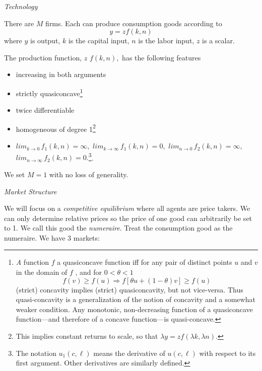 \documentclass{sebase}
\begin{document}
\textit{Technology}

There are $M$ firms. Each can produce consumption goods according to 
\begin{equation*}
y=zf(k,n)
\end{equation*}%
where $y$ is output, $k$ is the capital input, $n$ is the labor input, $z$
is a scalar.

\pagebreak

The production function, $z$ $f(k,n),$ has the following features

\begin{itemize}
\item increasing in both arguments

\item strictly quasiconcave\footnote{\textit{A} function $f$ a quasiconcave
function iff for any pair of distinct points $u$ and $v$ in the domain of $f$%
, and for $0<\theta <1$%
\begin{equation*}
f\left( v\right) \geq f\left( u\right) \Rightarrow f\left[ \theta u+\left(
1-\theta \right) v\right] \geq f\left( u\right)
\end{equation*}%
(strict) concavity implies (strict) quasiconcavity, but not vice-versa. Thus
quasi-concavity is a generalization of the notion of concavity and a
somewhat weaker condition. Any monotonic, non-decreasing function of a
quasiconcave function---and therefore of a concave function---is
quasi-concave.}

\item twice differentiable

\item homogeneous of degree 1\footnote{%
This implies constant returns to scale, so that $\lambda y=zf(\lambda
k,\lambda n).$}

\item $lim_{k\rightarrow 0}\,f_{1}(k,n)=\infty ,$ $lim_{k\rightarrow \infty
}\,f_{1}(k,n)=0,$ $lim_{n\rightarrow 0}\,f_{2}(k,n)=\infty ,$ $%
lim_{n\rightarrow \infty }\,f_{2}(k,n)=0.$\footnote{%
The notation $u_{1}(c,\ell )$ means the derivative of $u(c,\ell )$ with
respect to its first argument. Other derivatives are similarly defined.}.
\end{itemize}

We set $M=1$ with no loss of generality.

\pagebreak

\textit{Market Structure}

We will focus on a \textit{competitive equilibrium} where all agents are
price takers. We can only determine relative prices so the price of one good
can arbitrarily be set to 1. We call this good the \textit{numeraire}. Treat
the consumption good as the numeraire. We have 3 markets:
\end{document}
